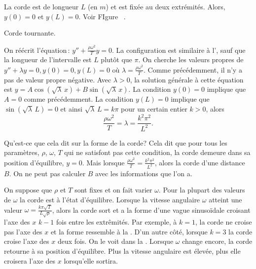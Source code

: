 La corde  est de longueur $L$ (en $m$) et est fixée au deux extrémités. Alors, $y(0) = 0$ et $y(L) = 0$.  Voir FIgure~
.

\begin{myfig}
\capstart
{}
\caption{Corde tournante.\label{bvp:whirstringfig}}
\end{myfig}

On réécrit l'équation\,: 
$y'' + \frac{\rho \omega^2}{T} y = 0$.
La configuration est similaire à l', sauf que  
la longueur de l'intervalle est $L$ plutôt que $\pi$.  On cherche les valeurs propres de  $y'' + \lambda y = 0, y(0) = 0, y(L) = 0$ où
$\lambda = \frac{\rho \omega^2}{T}$.  Comme précédemment, il n'y a pas de valeur propre négative. Avec $\lambda > 0$,
la solution générale à cette équation est $y = A \cos (  \sqrt{\lambda} \,x ) + B
\sin ( \sqrt{\lambda} \,x )$.  La condition $y(0) = 0$ implique que $A = 0$ comme précédemment. La condition $y(L) = 0$ implique que
$\sin ( \sqrt{\lambda} \, L) = 0$ et ainsi
$\sqrt{\lambda} \, L = k \pi$  pour un certain entier $k > 0$, alors
\begin{equation*}
\frac{\rho \omega^2}{T} = \lambda = \frac{k^2 \pi^2}{L^2} .
\end{equation*}

Qu'est-ce que cela dit sur la forme de la corde? Cela dit que pour tous les paramètres, $\rho$, $\omega$, $T$ qui ne satisfont pas cette condition, la corde demeure dans sa position d'équilibre, $y=0$.  Mais lorsque 
$\frac{\rho \omega^2}{T} = \frac{k^2 \pi^2}{L^2}$, alors la corde  d'une distance $B$. On ne peut pas calculer $B$ avec les informations que l'on a. 

On suppose que  $\rho$ et $T$ sont fixes et on fait varier $\omega$.
Pour la plupart des valeurs de $\omega$ la corde est à l'état d'équilibre. Lorsque la vitesse angulaire  $\omega$ atteint une valeur $\omega = \frac{k \pi \sqrt{T}}{L\sqrt{\rho}}$, alors la corde sort et a la forme d'une vague sinusoïdale croisant l'axe des 
$x$ $k-1$ fois entre les extrêmités. Par exemple, à $k=1$, la corde ne croise pas l'axe des $x$ et la forme ressemble à la .
D'un autre côté, lorsque  $k=3$ la corde croise l'axe des  $x$ deux fois. On le voit dans la  .
Lorsque $\omega$ change encore, la corde retourne à sa position d'équilibre. Plus la vitesse angulaire est élevée, plus elle croisera l'axe des  $x$ lorsqu'elle sortira. 

